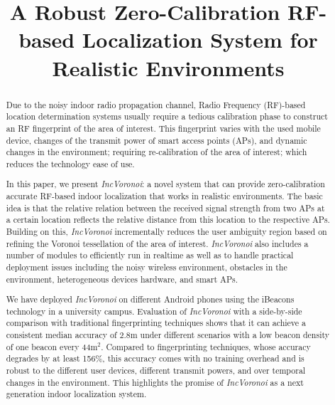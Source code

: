\documentclass[conference]{IEEEtran}
\def \sys {\textit{IncVoronoi}}
\begin{document}
\title{A Robust Zero-Calibration RF-based Localization System for Realistic Environments}

\author{
\and
{}
}

\maketitle

\begin{abstract}
Due to the noisy indoor radio propagation channel, Radio Frequency (RF)-based location determination systems usually require a tedious calibration phase to construct an RF fingerprint of the area of interest. This fingerprint varies with the used mobile device, changes of the transmit power of smart access points (APs), and dynamic changes in the environment; requiring re-calibration of the area of interest; which reduces the technology ease of use. 

In this paper, we present \sys{}: a novel system that can provide zero-calibration accurate RF-based indoor localization that works in realistic environments. The basic idea is that the relative relation between the received signal strength from two APs at a certain location reflects the relative distance from this location to the respective APs. Building on this, \sys{} incrementally reduces the user ambiguity region based on refining the Voronoi tessellation of the area of interest. 
\sys{} also includes a number of modules to efficiently run in realtime as well as to handle practical deployment issues including the noisy wireless environment, obstacles in the environment, heterogeneous devices hardware, and smart APs.

We have deployed \sys{} on different Android phones using the iBeacons technology in a university campus.
Evaluation of \sys{} with a side-by-side comparison with traditional fingerprinting techniques shows that it can achieve a consistent median accuracy of 2.8m under different scenarios with a low beacon density of one beacon every 44m$^2$. Compared to fingerprinting techniques, whose accuracy degrades by at least 156\%, this accuracy comes with no training overhead and is robust to the different user devices, different transmit powers, and over temporal changes in the environment. This highlights the promise of \sys{} as a next generation indoor localization system.
\end{abstract}
\end{document}
